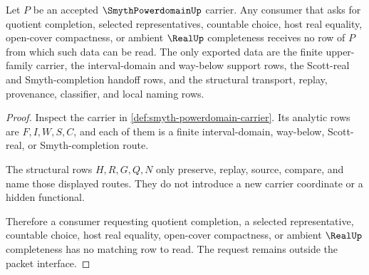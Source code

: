 \begin{theorem}
\label{thm:smyth-powerdomain-nonescape}
Let $P$ be an accepted $\SmythPowerdomainUp$ carrier. Any consumer that asks for quotient completion, selected representatives, countable choice, host real equality, open-cover compactness, or ambient $\RealUp$ completeness receives no row of $P$ from which such data can be read. The only exported data are the finite upper-family carrier, the interval-domain and way-below support rows, the Scott-real and Smyth-completion handoff rows, and the structural transport, replay, provenance, classifier, and local naming rows.
\end{theorem}
\begin{proof}
Inspect the carrier in \autoref{def:smyth-powerdomain-carrier}. Its analytic rows are $F,I,W,S,C$, and each of them is a finite interval-domain, way-below, Scott-real, or Smyth-completion route.

The structural rows $H,R,G,Q,N$ only preserve, replay, source, compare, and name those displayed routes. They do not introduce a new carrier coordinate or a hidden functional.

Therefore a consumer requesting quotient completion, a selected representative, countable choice, host real equality, open-cover compactness, or ambient $\RealUp$ completeness has no matching row to read. The request remains outside the packet interface.
\end{proof}


\begin{closurestatus}{\SmythPowerdomainUp}
  \theoryclosure{\seedClosure}
  \formalstatus{\unformalizedV}
\end{closurestatus}
